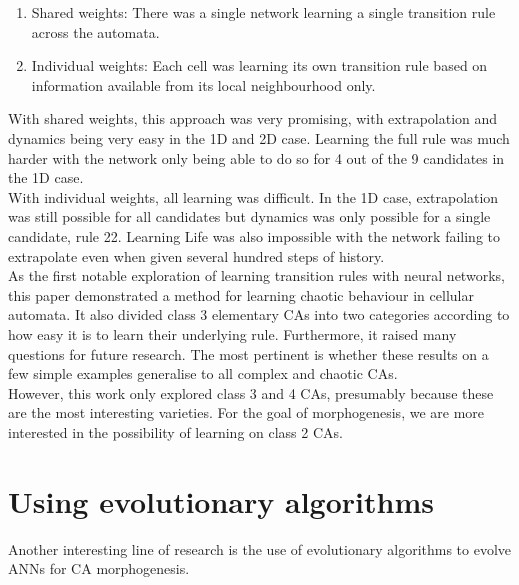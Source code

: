 \begin{enumerate}
  \item Shared weights: There was a single network learning a single transition rule across the automata.
  \item Individual weights: Each cell was learning its own transition rule based on information available from its local neighbourhood only.
\end{enumerate}

With shared weights, this approach was very promising, with extrapolation and dynamics being very easy in the 1D and 2D case.
Learning the full rule was much harder with the network only being able to do so for 4 out of the 9 candidates in the 1D case. \\ 

With individual weights, all learning was difficult. 
In the 1D case, extrapolation was still possible for all candidates but dynamics was only possible for a single candidate, rule 22. 
Learning Life was also impossible with the network failing to extrapolate even when given several hundred steps of history.\\ 

As the first notable exploration of learning transition rules with neural networks, this paper demonstrated a method for learning chaotic behaviour in cellular automata.
It also divided class 3 elementary CAs into two categories according to how easy it is to learn their underlying rule.
Furthermore, it raised many questions for future research.
The most pertinent is whether these results on a few simple examples generalise to all complex and chaotic CAs.\\

However, this work only explored class 3 and 4 CAs, presumably because these are the most interesting varieties.
For the goal of morphogenesis, we are more interested in the possibility of learning on class 2 CAs.

\section{Using evolutionary algorithms}
Another interesting line of research is the use of evolutionary algorithms to evolve ANNs for CA morphogenesis.\\

